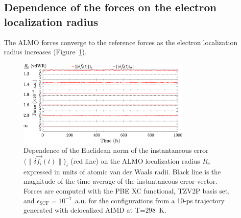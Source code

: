 \documentclass[aps,prl,reprint,amsmath,amssymb]{revtex4-1}
\begin{document}
\subsection{Dependence of the forces on the electron localization radius}

The ALMO forces converge to the reference forces as the electron localization radius increases (Figure~\ref{fig:forcecomp}).

\begin{figure}[h!]
\includegraphics[trim={0cm 0cm 0.1cm 0.1cm},clip,width=8.6cm]{DeltaForceComparison_ALMO_SCF.eps}
\caption{\label{fig:forcecomp} Dependence of the Euclidean norm of the instantaneous error $\langle \| \delta \vec{f_{i}}(t) \| \rangle_{i}$ (red line) on the ALMO localization radius $R_c$ expressed in units of atomic van der Waals radii. Black line is the magnitude of the time average of the instantaneous error vector. %
Forces are computed with the PBE XC functional, TZV2P basis set, and $\epsilon_{\text{SCF}} = 10^{-7}$~a.u. for the configurations from a 10-ps trajectory generated with delocalized AIMD at T=298~K.}
\end{figure}

\end{document}
